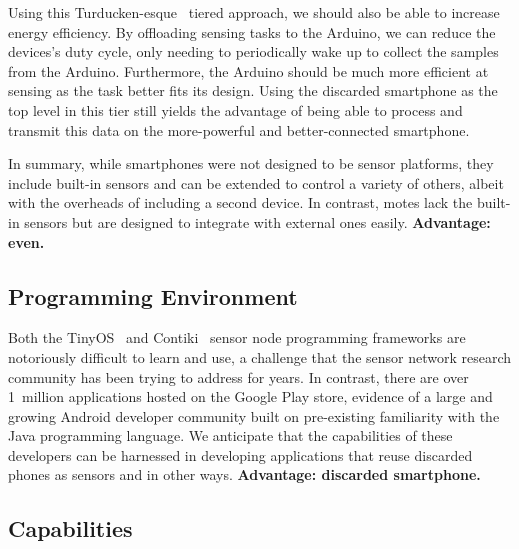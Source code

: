 Using this Turducken-esque~\cite{sorber2005turducken} tiered approach, we
should also be able to increase energy efficiency. By offloading sensing
tasks to the Arduino, we can reduce the devices's duty cycle, only needing to
periodically wake up to collect the samples from the Arduino.  Furthermore,
the Arduino should be much more efficient at sensing as the task better fits
its design. Using the discarded smartphone as the top level in this tier
still yields the advantage of being able to process and transmit this data on
the more-powerful and better-connected smartphone.

In summary, while smartphones were not designed to be sensor platforms, they
include built-in sensors and can be extended to control a variety of others,
albeit with the overheads of including a second device. In contrast, motes
lack the built-in sensors but are designed to integrate with external ones
easily. \textbf{Advantage: even.}

\subsection{Programming Environment}

Both the TinyOS~\cite{tinyos} and Contiki~\cite{contiki} sensor node
programming frameworks are notoriously difficult to learn and use, a
challenge that the sensor network research community has been trying to
address for years. In contrast, there are over 1~million applications hosted
on the Google Play store, evidence of a large and growing Android developer
community built on pre-existing familiarity with the Java programming
language. We anticipate that the capabilities of these developers can be
harnessed in developing applications that reuse discarded phones as sensors
and in other ways. \textbf{Advantage: discarded smartphone.}

\subsection{Capabilities}


